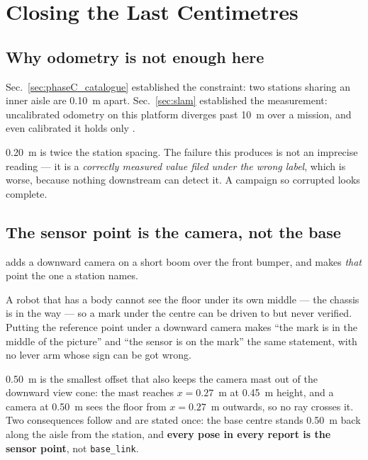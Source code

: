 \section{Closing the Last Centimetres}
\label{sec:phaseC_align}

\subsection{Why odometry is not enough here}

Sec.~\ref{sec:phaseC_catalogue} established the constraint: two stations
sharing an inner aisle are \SI{0.10}{m} apart. Sec.~\ref{sec:slam}
established the measurement: uncalibrated odometry on this platform
diverges past \SI{10}{m} over a mission, and even calibrated it holds
only .

\SI{0.20}{m} is twice the station spacing. The failure this produces is
not an imprecise reading --- it is a \emph{correctly measured value
filed under the wrong label}, which is worse, because nothing downstream
can detect it. A campaign so corrupted looks complete.

\subsection{The sensor point is the camera, not the base}

\phaseC{} adds a downward camera on a short boom over the front bumper,
and makes \emph{that} point the one a station names.

A robot that has a body cannot see the floor under its own middle --- the
chassis is in the way --- so a mark under the centre can be driven to but
never verified. Putting the reference point under a downward camera makes
``the mark is in the middle of the picture'' and ``the sensor is on the
mark'' the same statement, with no lever arm whose sign can be got wrong.

\SI{0.50}{m} is the smallest offset that also keeps the camera mast out
of the downward view cone: the mast reaches $x = 0.27$~m at \SI{0.45}{m}
height, and a camera at \SI{0.50}{m} sees the floor from $x = 0.27$~m
outwards, so no ray crosses it. Two consequences follow and are stated
once: the base centre stands \SI{0.50}{m} back along the aisle from the
station, and \textbf{every pose in every report is the sensor point},
not \texttt{base\_link}.

